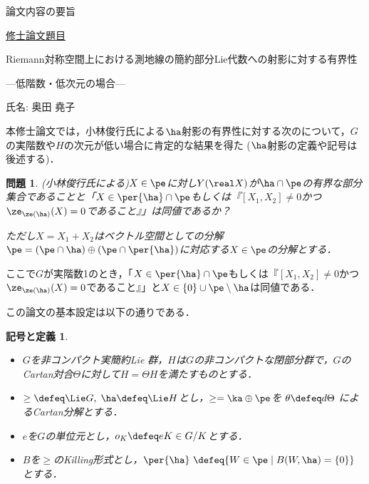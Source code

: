 \documentclass[12pt,dvipdfmx,uplatex]{jsarticle}
\newcounter{countabst}
\newtheorem{prob-a}[countabst]{問題}
\newtheorem{nttdef-a}[countabst]{記号と定義}
\begin{document}
% 
\begin{center}
論文内容の要旨
\end{center}

\noindent\underline{修士論文題目}

\begin{center}
Riemann対称空間上における測地線の簡約部分Lie代数への射影に対する有界性

---低階数・低次元の場合---
\end{center}

\noindent 氏名: 奥田 堯子

\vspace{1em}

本修士論文では，小林俊行氏による$\ha$射影の有界性に対する次のについて，$G$の実階数や$H$の次元が低い場合に肯定的な結果を得た ($\ha$射影の定義や記号は後述する)．

\begin{prob-a}(小林俊行氏による)\label{prob:1121}
  $X\in \pe$に対し$Y(\real X)$が$ \ha\cap \pe$の有界な部分集合であることと「$X\in \per{\ha}\cap\pe $もしくは『$ [X_1, X_2]\neq 0 $かつ$\ze_{\ze(\ha)}(X) = 0$であること』」は同値であるか？

  ただし$X = X_1 + X_2 $はベクトル空間としての分解$\pe =(\pe\cap \ha)\oplus(\pe\cap\per{\ha}) $に対応する$X\in \pe$の分解とする．
\end{prob-a}

ここで$G$が実階数1のとき，「$X\in \per{\ha}\cap\pe $もしくは『$ [X_1, X_2]\neq 0 $かつ$\ze_{\ze(\ha)}(X) = 0$であること』」と$X\in \{0\}\cup\pe\setminus\ha $は同値である．


この論文の基本設定は以下の通りである．
\begin{nttdef-a}
  \leavevmode\vspace{-1em}
  \begin{itemize}
  \item $G$を非コンパクト実簡約Lie 群，$H$は$G$の非コンパクトな閉部分群で，$G$のCartan対合$\Theta$に対して$H = \Theta H$を満たすものとする．
  \item $\ge \defeq \Lie G,\; \ha \defeq \Lie H$とし，$\ge = \ka\oplus \pe$を $\theta \defeq d\Theta$ によるCartan分解とする．
  \item  $e$を$G$の単位元とし，$o_K \defeq eK\in G/K$とする．
  \item $B$を$\ge$のKilling形式とし，$\per{\ha}\ \defeq \{W\in \pe\mid B(W, \ha) = \{0\}\} $とする．
  \end{itemize}  
\end{nttdef-a}
\end{document}
